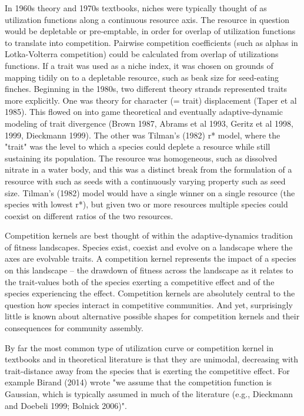 \documentclass[a4paper,11pt]{article}
\begin{document}
In 1960s theory and 1970s textbooks, niches were typically thought of as utilization functions along a continuous resource axis. The resource in question would be depletable or pre-emptable, in order for overlap of utilization functions to translate into competition. Pairwise competition coefficients (such as alphas in Lotka-Volterra competition) could be calculated from overlap of utilizations functions. If a trait was used as a niche index, it was chosen on grounds of mapping tidily on to a depletable resource, such as beak size for seed-eating finches. Beginning in the 1980s, two different theory strands represented traits more explicitly. One was theory for character (= trait) displacement (Taper et al 1985). This flowed on into game theoretical and eventually adaptive-dynamic modeling of trait divergence (Brown 1987, Abrams et al 1993, Geritz et al 1998, 1999, Dieckmann 1999). The other was Tilman's (1982) r* model, where the "trait" was the level to which a species could deplete a resource while still sustaining its population. The resource was homogeneous, such as dissolved nitrate in a water body, and this was a distinct break from the formulation of a resource with such as seeds with a continuously varying property such as seed size. Tilman's (1982) model would have a single winner on a single resource (the species with lowest r*), but given two or more resources multiple species could coexist on different ratios of the two resources. 


Competition kernels are best thought of within the adaptive-dynamics tradition of fitness landscapes. Species exist, coexist and evolve on a landscape where the axes are evolvable traits. A competition kernel represents the impact of a species on this landscape -- the drawdown of fitness across the landscape as it relates to the trait-values both of the species exerting a competitive effect and of the species experiencing the effect. Competition kernels are absolutely central to the question how species interact in competitive communities. And yet, surprisingly little is known about alternative possible shapes for competition kernels and their consequences for community assembly. 

By far the most common type of utilization curve or competition kernel in textbooks and in theoretical literature is that they are unimodal, decreasing with trait-distance away from the species that is exerting the competitive effect. For example Birand (2014) wrote "we assume that the competition function is Gaussian, which is typically assumed in much of the literature (e.g., Dieckmann and Doebeli 1999; Bolnick 2006)". 
\end{document}

